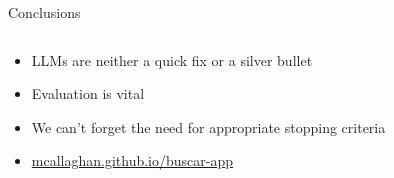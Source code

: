 \documentclass[9pt,aspectratio=169]{beamer}
\begin{document}
\begin{frame}{Conclusions}
	\begin{columns}
		\begin{column}{0.4\linewidth}
			\begin{itemize}
				\item<1-> LLMs are neither a quick fix or a silver bullet
				\item<2-> Evaluation is vital
				\item<3-> We can't forget the need for appropriate stopping criteria \cite{callaghan_statistical_2020}
				\item<4->\url{mcallaghan.github.io/buscar-app}
			\end{itemize}
		\end{column}
		\begin{column}{0.6\linewidth}
			\begin{figure}
			\end{figure}
		\end{column}
	\end{columns}

\end{frame}
	
\end{document}
